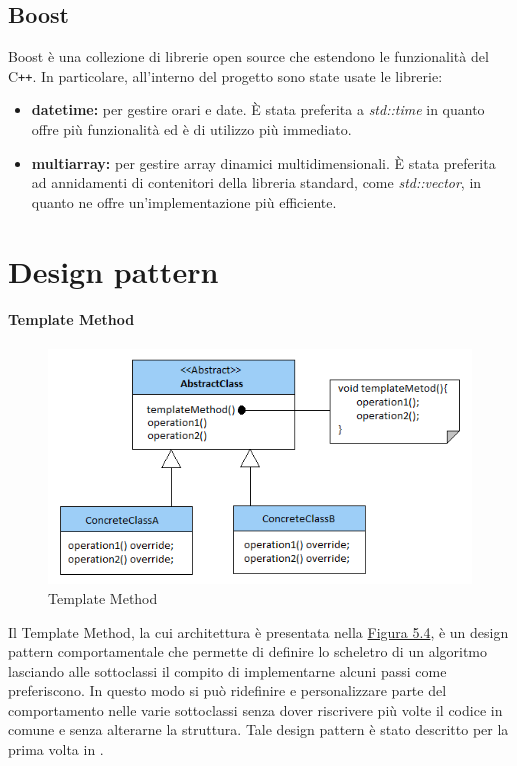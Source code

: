 \subsection{Boost}
Boost  è una collezione di librerie open source che estendono le funzionalità del C\texttt{++}. In particolare, all'interno del progetto sono state usate le librerie:
\begin{itemize}
    \item \textbf{date\textunderscore time:} per gestire orari e date. È stata preferita a \textit{std::time} in quanto offre più funzionalità ed è di utilizzo più immediato.
    \item\textbf{multi\textunderscore array:} per gestire array dinamici multidimensionali. È stata preferita ad annidamenti di contenitori della libreria standard, come \textit{std::vector}, in quanto ne offre un'implementazione più efficiente.
\end{itemize}
\section{Design pattern}
\paragraph{Template Method}
\begin{figure}[!h]
    \label{fig54}
    \centering
        \includegraphics[width=12cm,keepaspectratio]{../immagini/templatemethod.png}
        \caption{Template Method}
\end{figure}
Il Template Method, la cui architettura è presentata nella \hyperref[fig54]{Figura 5.4}, è un design pattern comportamentale che permette di definire lo scheletro di un algoritmo lasciando alle sottoclassi il compito di implementarne alcuni passi come preferiscono. In questo modo si può ridefinire e personalizzare parte del comportamento nelle varie sottoclassi senza dover riscrivere più volte il codice in comune e senza alterarne la struttura. Tale design pattern è stato descritto per la prima volta in .


